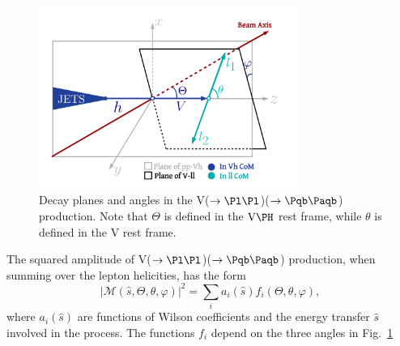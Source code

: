 \documentclass[a4paper,11pt]{article}
\newcommand{\Pb}{{{\Pqb}}\xspace}
\newcommand{\PAb}{{{{\Paqb}}}\xspace}
\renewcommand{\PV}{{{{V}}}\xspace}
\begin{document}
\begin{figure}[hbtp]
\begin{center}
\includegraphics[width=0.75\textwidth]{Figures/LHE/TheThreeAnglesVh.pdf}
\end{center}
\caption{
Decay planes and angles in the \PV($\rightarrow \textrm{\Pl} \textrm{\Pl}$)\PH($\rightarrow \Pb \PAb$) production. Note that $\Theta$ is defined in the $\textrm{\PV}\PH$ rest frame, while $\theta$ is defined in the \PV rest frame.
}
\label{fig:HelicityFrame}
\end{figure}

The squared amplitude of \PV($\to \Pl \Pl$)\PH($\to \Pb \PAb$) production, when summing over the lepton helicities, has the form
\begin{equation}
	|\mathcal{M} \left(\hat{s}, \Theta, \theta, \varphi \right)|^{2} = {\sum}_{i} a_i \left(\hat{s}\right) f_i \left(\Theta, \theta, \varphi \right),
\label{Eq:Amplitude}
\end{equation}
where $a_i\left(\hat{s}\right)$ are functions of Wilson coefficients and the energy transfer $\hat{s}$ involved in the process.
The functions $f_i$ depend on the three angles in Fig.~\ref{fig:HelicityFrame}
\end{document}
